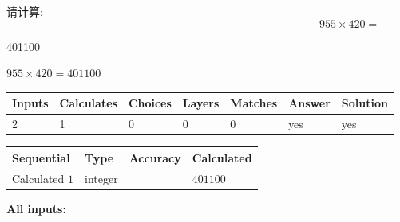 \documentclass{ctexart}
\begin{document}
  
 
请计算:
\begin{equation}
955  \times    %
420 = \nonumber
\end{equation}
 
 
 
\noindent{}
 
 

401100
 
 
\noindent{}
 
 

 
 
 
\noindent{}
 
 

$ %
955 \times  %
420=   %
401100$
 
 
\noindent{}
 
 

 
   
   
   
   
\noindent\begin{tabular}{|l|l|l|l|l|l|l|}
 \hline
Inputs & Calculates & Choices & Layers & Matches & Answer & Solution \\ \hline
 2  & 
 1  & 
 0
  & 
 0  & 
 0  & 
  yes & 
  yes 
  \\ \hline
 \end{tabular}
   
   
   
   
\noindent{}
   
   
  
  
\noindent\begin{tabular}{|l|l|l|l|}
\hline
 Sequential & Type & Accuracy & Calculated \\ 
\hline
 
 
  Calculated $  1 $ & integer &  & 
  $ 401100 $ 
 \\  \hline  
 \end{tabular}
   
   
   
   
\noindent\vspace{0.1in}\hspace{-0.08in} {\textbf{\Large{All inputs: }}}
   
\end{document}

